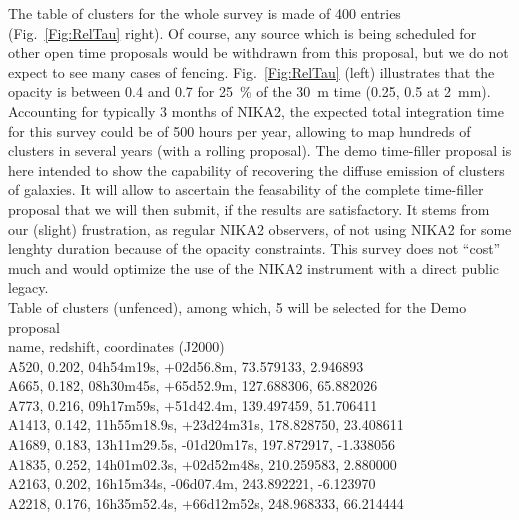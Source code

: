 \documentclass[11pt,a4paper,twoside,graphicx,color]{article}
\begin{document}
The table of clusters for the whole survey is made of 400 entries
(Fig.~\ref{Fig:RelTau} right). Of course, any source which is being
scheduled for other open time proposals would be withdrawn from this
proposal, but we do not expect to see many cases of fencing.
Fig.~\ref{Fig:RelTau} (left) illustrates that the opacity is between
0.4 and 0.7 for 25~\% of the 30~m time (0.25, 0.5 at 2~mm). Accounting
for typically 3 months of NIKA2, the expected total integration time
for this survey could be of 500 hours per year, allowing to map
hundreds of clusters in several years (with a rolling proposal). The
demo time-filler proposal is here intended to show the capability of
recovering the diffuse emission of clusters of galaxies. It will allow
to ascertain the feasability of the complete time-filler proposal that
we will then submit, if the results are satisfactory. It stems from
our (slight) frustration, as regular NIKA2 observers, of not using
NIKA2 for some lenghty duration because of the opacity
constraints. This survey does not ``cost'' much and would optimize the
use of the NIKA2 instrument with a direct public legacy.\\

Table of  clusters (unfenced), among which, 5 will be selected for the Demo proposal\\
name, redshift, coordinates (J2000)\\
A520,  0.202, 04h54m19s,   +02d56.8m,	73.579133, 2.946893 \\
A665,  0.182, 08h30m45s,   +65d52.9m,	127.688306, 65.882026\\
A773,  0.216, 09h17m59s,   +51d42.4m,	139.497459, 51.706411\\
A1413, 0.142, 11h55m18.9s, +23d24m31s,	178.828750, 23.408611\\
A1689, 0.183, 13h11m29.5s, -01d20m17s,	197.872917, -1.338056\\
A1835, 0.252, 14h01m02.3s, +02d52m48s,	210.259583, 2.880000\\
A2163, 0.202, 16h15m34s,   -06d07.4m,   243.892221, -6.123970\\
A2218, 0.176, 16h35m52.4s, +66d12m52s,	248.968333, 66.214444\\
\end{document}

